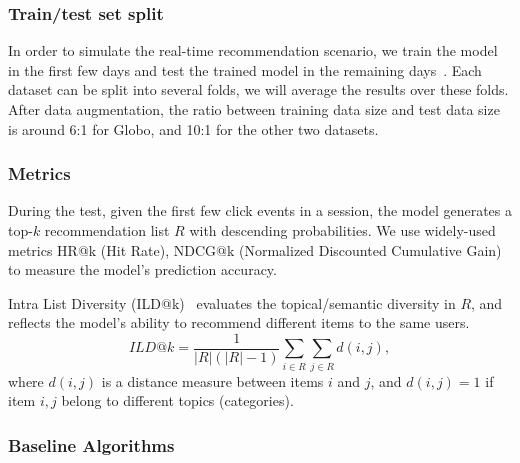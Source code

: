 \subsubsection{Train/test set split}
In order to simulate the real-time recommendation 
scenario, we train the model in the first few days and test the trained model in the remaining
days~\cite{jugovac_streamingrec:_2018}. Each dataset can be split into several folds, 
we will average the results over these folds.
After data augmentation, the ratio between training data size and test data size 
is around 6:1 for Globo, and 10:1 for the other two datasets. 


\subsubsection{Metrics}
During the test, given the first few click events in a session, the model generates 
a top-$k$ recommendation list $R$ with descending probabilities. 
We use widely-used metrics HR@k (Hit Rate), NDCG@k (Normalized Discounted Cumulative Gain) to 
measure the model's prediction accuracy.

Intra List Diversity (ILD@k)~\cite{symeonidis2020session} evaluates the topical/semantic 
diversity in $R$, and reflects the model's ability to recommend different items to the same users. 
\begin{equation}
  ILD@k = \frac{1}{|R|(|R|-1)}\sum_{i\in R}\sum_{j\in R}d(i,j),
\end{equation}
where $d(i, j)$ is a distance measure between items $i$ and $j$, and 
$d(i, j) = 1$ if item $i, j$ belong to different topics (categories).

\subsubsection{Baseline Algorithms}

